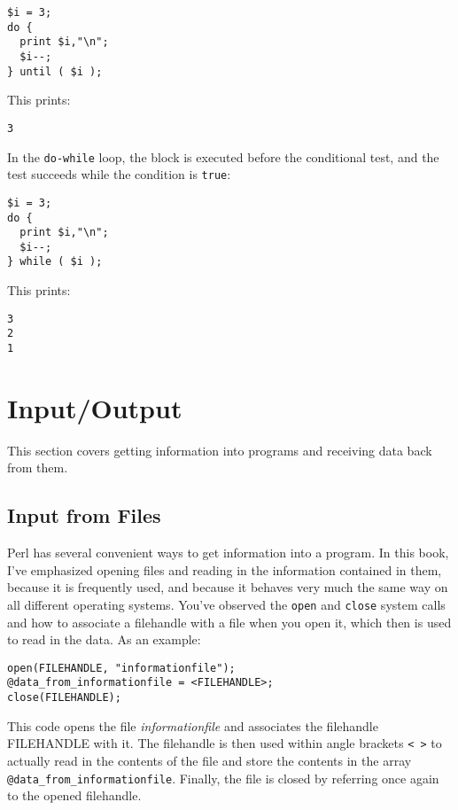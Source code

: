 \begin{lstlisting}
$i = 3;
do {
  print $i,"\n";
  $i--;
} until ( $i );
\end{lstlisting}

This prints:

\begin{lstlisting}
3
\end{lstlisting}

In the \verb|do-while| loop, the block is executed before the conditional test, and the test succeeds while the condition is \verb|true|:

\begin{lstlisting}
$i = 3;
do {
  print $i,"\n";
  $i--;
} while ( $i );
\end{lstlisting}

This prints:

\begin{lstlisting}
3
2
1
\end{lstlisting}

\section{Input/Output}
This section covers getting information into programs and receiving data back from them.

\subsection{Input from Files}
Perl has several convenient ways to get information into a program. In this book, I've emphasized opening files and reading in the information contained in them, because it is frequently used, and because it behaves very much the same way on all different operating systems. You've observed the \verb|open| and \verb|close| system calls and how to associate a filehandle with a file when you open it, which then is used to read in the data. As an example:

\begin{lstlisting}
open(FILEHANDLE, "informationfile");
@data_from_informationfile = <FILEHANDLE>;
close(FILEHANDLE);
\end{lstlisting}

This code opens the file \textit{informationfile} and associates the filehandle FILEHANDLE with it. The filehandle is then used within angle brackets \verb|< >| to actually read in the contents of the file and store the contents in the array \verb|@data_from_informationfile|. Finally, the file is closed by referring once again to the opened filehandle.

